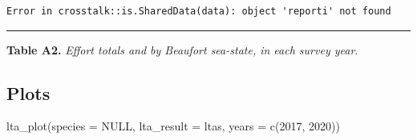 \documentclass[
]{book}
\newenvironment{Shaded}{\begin{snugshade}}{\end{snugshade}}
\newcommand{\AttributeTok}[1]{\textcolor[rgb]{0.77,0.63,0.00}{#1}}
\newcommand{\ConstantTok}[1]{\textcolor[rgb]{0.00,0.00,0.00}{#1}}
\newcommand{\ControlFlowTok}[1]{\textcolor[rgb]{0.13,0.29,0.53}{\textbf{#1}}}
\newcommand{\DecValTok}[1]{\textcolor[rgb]{0.00,0.00,0.81}{#1}}
\newcommand{\FunctionTok}[1]{\textcolor[rgb]{0.00,0.00,0.00}{#1}}
\newcommand{\NormalTok}[1]{#1}
\newcommand{\SpecialCharTok}[1]{\textcolor[rgb]{0.00,0.00,0.00}{#1}}
\newcommand{\StringTok}[1]{\textcolor[rgb]{0.31,0.60,0.02}{#1}}
\begin{document}
\begin{Shaded}
\end{Shaded}

\begin{verbatim}
Error in crosstalk::is.SharedData(data): object 'reporti' not found
\end{verbatim}

\begin{center}\rule{0.5\linewidth}{0.5pt}\end{center}

\textbf{Table A2.} \emph{Effort totals and by Beaufort sea-state, in each survey year}.

\begin{Shaded}
\end{Shaded}

\hypertarget{plots-1}{%
\subsection*{Plots}\label{plots-1}}

\begin{Shaded}
\begin{Highlighting}[]
\FunctionTok{lta\_plot}\NormalTok{(}\AttributeTok{species =} \ConstantTok{NULL}\NormalTok{, }
         \AttributeTok{lta\_result =}\NormalTok{ ltas, }
         \AttributeTok{years =} \FunctionTok{c}\NormalTok{(}\DecValTok{2017}\NormalTok{, }\DecValTok{2020}\NormalTok{))}
\end{Highlighting}
\end{Shaded}
\end{document}
